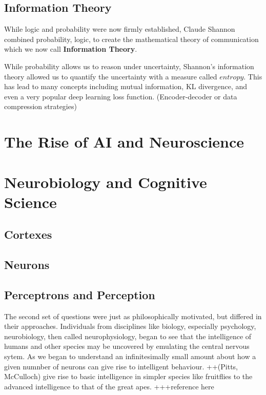 \documentclass[]{book}
\theoremstyle{definition}
\theoremstyle{definition}
\theoremstyle{definition}
\theoremstyle{remark}
\begin{document}
\subsection{Information Theory}\label{information-theory}

While logic and probability were now firmly established, Claude Shannon
combined probability, logic, to create the mathematical theory of
communication which we now call \textbf{Information Theory}.

While probability allows us to reason under uncertainty, Shannon's
information theory allowed us to quantify the uncertainty with a measure
called \(entropy\). This has lead to many concepts including mutual
information, KL divergence, and even a very popular deep learning loss
function. (Encoder-decoder or data compression strategies)

\section{The Rise of AI and
Neuroscience}\label{the-rise-of-ai-and-neuroscience}

\section{Neurobiology and Cognitive
Science}\label{neurobiology-and-cognitive-science}

\subsection{Cortexes}\label{cortexes}

\subsection{Neurons}\label{neurons}

\subsection{Perceptrons and
Perception}\label{perceptrons-and-perception}

The second set of questions were just as philosophically motivated, but
differed in their approaches. Individuals from disciplines like biology,
especially psychology, neurobiology, then called neurophysiology, began
to see that the intelligence of humans and other species may be
uncovered by emulating the central nervous sytem. As we began to
understand an infinitesimally small amount about how a given numnber of
neurons can give rise to intelligent behaviour. ++(Pitts, McCulloch)
give rise to basic intelligence in simpler species like fruitflies to
the advanced intelligence to that of the great apes. +++reference here
\end{document}
